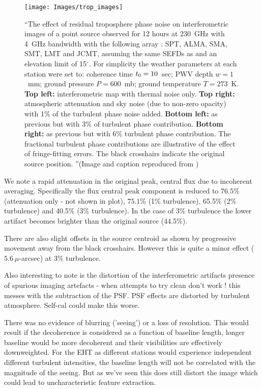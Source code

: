 \begin{figure}[h!]
\texttt{[image: Images/trop\_images]}
\caption{``The effect of residual troposphere phase noise on interferometric images of a point source observed for 12 hours at 230~GHz with 4~GHz bandwidth with the following array : SPT, ALMA, SMA, SMT, LMT and JCMT, assuming the same SEFDs as \protect\citet{Lu_2014} and an elevation limit of 15$^\circ$. For simplicity the weather parameters at each station were set to: coherence time $t_{\rm 0}=10$~sec; PWV depth $w=1$~mm; ground pressure $P=600$~mb; ground temperature $T =273$~K. {\bf Top left:} interferometric map with thermal noise only. {\bf Top right:} atmospheric attenuation and sky noise (due to non-zero opacity) with 1\% of the turbulent phase noise added. {\bf Bottom left:} as previous but with 3\% of turbulent phase contribution. {\bf Bottom right:} as previous but with 6\% turbulent phase contribution. The fractional turbulent phase contributions are illustrative of the effect of fringe-fitting errors. The black crosshairs indicate the original source position. ''(Image and caption reproduced from \citet{Blecher_2016}) \label{fig:trop_images}%
}
\end{figure}


We note a rapid attenuation in the original peak, central flux due to incoherent averaging. Specifically the flux central peak component is reduced to $76.5\%$ (attenuation only - not shown in plot), $75.1\%$ (1\% turbulence), 65.5\% (2\% turbulence) and  40.5\% (3\% turbulence). In the case of 3\% turbulence the lower artifact becomes brighter than the original source (44.5\%). 

There are also slight offsets in the source centroid as shown by progressive movement away from the black crosshairs. However this is quite a minor effect ($5.6\ \mu$-arcsec) at 3\% turbulence. 


Also interesting to note is the distortion of the interferometric artifacts presence of spurious imaging artefacts - when attempts to try clean don't work ! this messes with the subtraction of the PSF. PSF effects are distorted by turbulent atmosphere. Self-cal could make this worse.


There was no evidence of blurring ('seeing') or a loss of resolution. This would result if the decoherence is considered as a function of baseline length, longer baseline would be more decoherent and their visibilities are effectively downweighted. For the EHT as different stations would experience independent different turbulent intensities, the baseline length will not be correlated with the magnitude of the seeing. But as we've seen this does still distort the image which could lead to uncharacteristic feature extraction.

